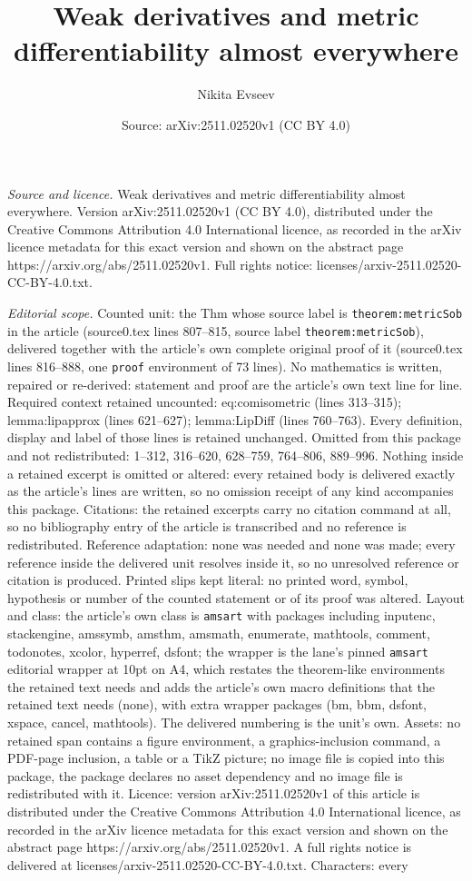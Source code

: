 \documentclass[10pt,a4paper]{amsart}
\title[Weak derivatives and metric differentiability almost everywh]{Weak derivatives and metric differentiability almost everywhere}
\author{Nikita Evseev}
\date{Source: arXiv:2511.02520v1 (CC BY 4.0)}
\begin{document}
\maketitle

\noindent\emph{Source and licence.} Weak derivatives and metric differentiability almost everywhere. Version arXiv:2511.02520v1 (CC BY 4.0), distributed under the Creative Commons Attribution 4.0 International licence, as recorded in the arXiv licence metadata for this exact version and shown on the abstract page https://arxiv.org/abs/2511.02520v1. Full rights notice: licenses/arxiv-2511.02520-CC-BY-4.0.txt.\par\smallskip

\noindent\textit{Editorial scope.} Counted unit: the Thm whose source label is \texttt{theorem:metricSob} in the article (source0.tex lines 807--815, source label \texttt{theorem:metricSob}), delivered together with the article's own complete original proof of it (source0.tex lines 816--888, one \texttt{proof} environment of 73 lines). No mathematics is written, repaired or re-derived: statement and proof are the article's own text line for line. Required context retained uncounted: eq:comisometric (lines 313--315); lemma:lipapprox (lines 621--627); lemma:LipDiff (lines 760--763). Every definition, display and label of those lines is retained unchanged. Omitted from this package and not redistributed: 1--312, 316--620, 628--759, 764--806, 889--996. Nothing inside a retained excerpt is omitted or altered: every retained body is delivered exactly as the article's lines are written, so no omission receipt of any kind accompanies this package. Citations: the retained excerpts carry no citation command at all, so no bibliography entry of the article is transcribed and no reference is redistributed. Reference adaptation: none was needed and none was made; every reference inside the delivered unit resolves inside it, so no unresolved reference or citation is produced. Printed slips kept literal: no printed word, symbol, hypothesis or number of the counted statement or of its proof was altered. Layout and class: the article's own class is \texttt{amsart} with packages including inputenc, stackengine, amssymb, amsthm, amsmath, enumerate, mathtools, comment, todonotes, xcolor, hyperref, dsfont; the wrapper is the lane's pinned \texttt{amsart} editorial wrapper at 10pt on A4, which restates the theorem-like environments the retained text needs and adds the article's own macro definitions that the retained text needs (none), with extra wrapper packages (bm, bbm, dsfont, xspace, cancel, mathtools). The delivered numbering is the unit's own. Assets: no retained span contains a figure environment, a graphics-inclusion command, a PDF-page inclusion, a table or a TikZ picture; no image file is copied into this package, the package declares no asset dependency and no image file is redistributed with it. Licence: version arXiv:2511.02520v1 of this article is distributed under the Creative Commons Attribution 4.0 International licence, as recorded in the arXiv licence metadata for this exact version and shown on the abstract page https://arxiv.org/abs/2511.02520v1. A full rights notice is delivered at licenses/arxiv-2511.02520-CC-BY-4.0.txt. Characters: every 
\end{document}
